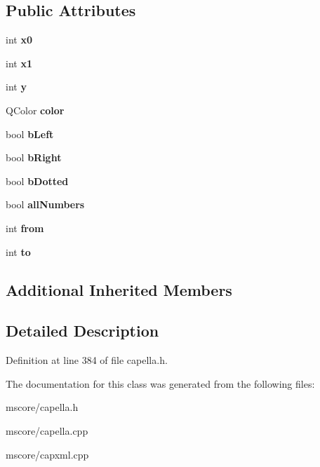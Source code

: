 \subsection*{Public Attributes}
\begin{DoxyCompactItemize}
\item 
\mbox{\label{class_ms_1_1_volta_obj_a0102d2868249004d6c194ad7d200b919}} 
int {\bfseries x0}
\item 
\mbox{\label{class_ms_1_1_volta_obj_a955755cfeeed95b45ab811ed0ea1536b}} 
int {\bfseries x1}
\item 
\mbox{\label{class_ms_1_1_volta_obj_ad5dcd626f136658b885d356bacf6984b}} 
int {\bfseries y}
\item 
\mbox{\label{class_ms_1_1_volta_obj_a186cc5d7eb5f24f23e5f106b0f6d01b7}} 
Q\+Color {\bfseries color}
\item 
\mbox{\label{class_ms_1_1_volta_obj_a73e331019b9a8d9d830c8c7b0f1d5d86}} 
bool {\bfseries b\+Left}
\item 
\mbox{\label{class_ms_1_1_volta_obj_ab374b39f2b7f12e55cfbf50dd0322592}} 
bool {\bfseries b\+Right}
\item 
\mbox{\label{class_ms_1_1_volta_obj_a60c61d4516128615a31cb60dff6e7577}} 
bool {\bfseries b\+Dotted}
\item 
\mbox{\label{class_ms_1_1_volta_obj_a37285978f5eeb75c488bcf94dec77905}} 
bool {\bfseries all\+Numbers}
\item 
\mbox{\label{class_ms_1_1_volta_obj_af48c44a8b8d5a3606be4c2b01305d64e}} 
int {\bfseries from}
\item 
\mbox{\label{class_ms_1_1_volta_obj_aac1ad402527937140d60822c545a889e}} 
int {\bfseries to}
\end{DoxyCompactItemize}
\subsection*{Additional Inherited Members}


\subsection{Detailed Description}


Definition at line 384 of file capella.\+h.



The documentation for this class was generated from the following files\+:\begin{DoxyCompactItemize}
\item 
mscore/capella.\+h\item 
mscore/capella.\+cpp\item 
mscore/capxml.\+cpp\end{DoxyCompactItemize}
